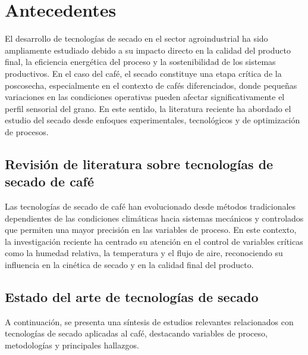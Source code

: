 \section{Antecedentes}

El desarrollo de tecnologías de secado en el sector agroindustrial ha sido ampliamente estudiado debido a su impacto directo en la calidad del producto final, la eficiencia energética del proceso y la sostenibilidad de los sistemas productivos. En el caso del café, el secado constituye una etapa crítica de la poscosecha, especialmente en el contexto de cafés diferenciados, donde pequeñas variaciones en las condiciones operativas pueden afectar significativamente el perfil sensorial del grano. En este sentido, la literatura reciente ha abordado el estudio del secado desde enfoques experimentales, tecnológicos y de optimización de procesos.

\subsection{Revisión de literatura sobre tecnologías de secado de café}

Las tecnologías de secado de café han evolucionado desde métodos tradicionales dependientes de las condiciones climáticas hacia sistemas mecánicos y controlados que permiten una mayor precisión en las variables de proceso. En este contexto, la investigación reciente ha centrado su atención en el control de variables críticas como la humedad relativa, la temperatura y el flujo de aire, reconociendo su influencia en la cinética de secado y en la calidad final del producto.

\subsection{Estado del arte de tecnologías de secado}

A continuación, se presenta una síntesis de estudios relevantes relacionados con tecnologías de secado aplicadas al café, destacando variables de proceso, metodologías y principales hallazgos.

